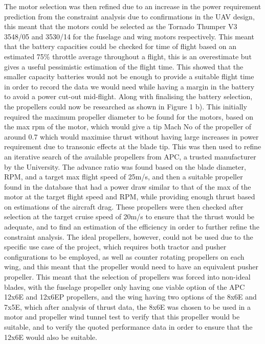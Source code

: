 \documentclass[../../main.tex]{subfiles}
\begin{document}
The motor selection was then refined due to an increase in the power requirement prediction from the constraint analysis due to confirmations in the UAV design, this meant that the motors could be selected as the Tornado Thumper V3 3548/05 and 3530/14 for the fuselage and wing motors respectively.
This meant that the battery capacities could be checked for time of flight based on an estimated 75\% throttle average throughout a flight, this is an overestimate but gives a useful pessimistic estimation of the flight time.
This showed that the smaller capacity batteries would not be enough to provide a suitable flight time in order to record the data we would need while having a margin in the battery to avoid a power cut-out mid-flight.
Along with finalising the battery selection, the propellers could now be researched as shown in Figure 1 b).
This initially required the maximum propeller diameter to be found for the motors, based on the max rpm of the motor, which would give a tip Mach No of the propeller of around 0.7 which would maximise thrust without having large increases in power requirement due to transonic effects at the blade tip.
This was then used to refine an iterative search of the available propellers from APC, a trusted manufacturer by the University.
The advance ratio was found based on the blade diameter, RPM, and a target max flight speed of 25m/s, and then a suitable propeller found in the database that had a power draw similar to that of the max of the motor at the target flight speed and RPM, while providing enough thrust based on estimations of the aircraft drag.
These propellers were then checked after selection at the target cruise speed of 20m/s to ensure that the thrust would be adequate, and to find an estimation of the efficiency in order to further refine the constraint analysis.
The ideal propellers, however, could not be used due to the specific use case of the project, which requires both tractor and pusher configurations to be employed, as well as counter rotating propellers on each wing, and this meant that the propeller would need to have an equivalent pusher propeller.
This meant that the selection of propellers was forced into non-ideal blades, with the fuselage propeller only having one viable option of the APC 12x6E and 12x6EP propellers, and the wing having two options of the 8x6E and 7x5E, which after analysis of thrust data, the 8x6E was chosen to be used in a motor and propeller wind tunnel test to verify that this propeller would be suitable, and to verify the quoted performance data in order to ensure that the 12x6E would also be suitable. 
\end{document}
